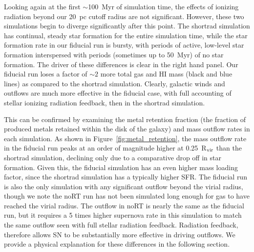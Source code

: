 \documentclass[twocolumn]{aastex62}
\begin{document}
Looking again at the first $\sim$100~Myr of simulation time, the effects of ionizing radiation beyond our 20~pc cutoff radius are not significant. However, these two simulations begin to diverge significantly after this point. The shortrad simulation has continual, steady star formation for the entire simulation time, while the star formation rate in our fiducial run is bursty, with periods of active, low-level star formation interspersed with periods (sometimes up to 50~Myr) of no star formation. The driver of these differences is clear in the right hand panel. Our fiducial run loses 
    a factor of $\sim 2$ more 
total gas and HI mass (black and blue lines) as compared to the shortrad simulation. 
Clearly, galactic winds and outflows are much more effective in the fiducial case, with full accounting of stellar ionizing radiation feedback, then in the shortrad simulation.

This can be confirmed by examining the metal retention fraction (the fraction of produced metals retained within the disk of the galaxy) and mass outflow rates in each simulation. As shown in Figure~\ref{fig:metal_retention}, the mass outflow rate in the fiducial run peaks at an order of magnitude higher at 0.25~R$_{\rm vir}$ than the shortrad simulation, declining only due to a comparative drop off in star formation. Given this, the fiducial simulation has an even higher mass loading factor, since the shortrad simulation has a typically higher SFR. The fiducial run is also the only simulation with any significant outflow beyond the virial radius, though we note the noRT run has not been simulated long enough for gas to have reached the virial radius. The outflow in noRT is nearly the same as the fiducial run, but it requires a 5 times higher supernova rate in this simulation to match the same outflow seen with full stellar radiation feedback. Radiation feedback, therefore allows SN to be substantially more effective in driving outflows. We provide a physical
   explanation
for these differences in the following section.
\end{document}
